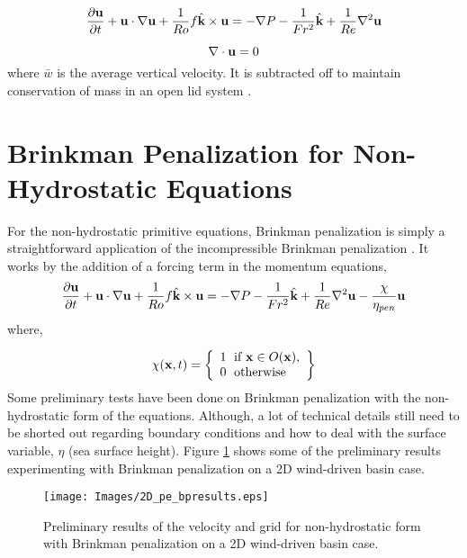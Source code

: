 \begin{equation*} \label{e:nh_momentum}
\frac{\partial {\bf u}}{\partial t} + {\bf u} \cdot \nabla {\bf u} + \frac{1}{Ro} f \hat{\bf k} \times {\bf u} = -\nabla P - \frac{1}{Fr^2} \hat{\bf k} + \frac{1}{Re} \nabla ^2 {\bf u} 
\end{equation*}

\begin{equation*}\label{e:nh_continuity}
\nabla \cdot {\bf u} = 0
\end{equation*}
%
where $\bar{w}$ is the average vertical velocity.  It is subtracted off to maintain conservation of mass in an open lid system \cite{97MAHPH}.

\section{Brinkman Penalization for Non-Hydrostatic Equations}

For the non-hydrostatic primitive equations, Brinkman penalization is simply a straightforward application of the incompressible Brinkman penalization \cite{84AC}.  It works by the addition of a forcing term in the momentum equations,   
%
\begin{equation*} \label{e:nh_momentum}
\frac{\partial {\bf u}}{\partial t} + {\bf u} \cdot \nabla {\bf u} + \frac{1}{Ro} f \hat{\bf k} \times {\bf u} = -\nabla P - \frac{1}{Fr^2} \hat{\bf k} + \frac{1}{Re} \nabla ^2 {\bf u} - \frac{\chi}{\eta_{pen}} {\bf u}
\end{equation*}
where, 

\begin{equation*} \label{e:nh_chi}
\chi ({\bf x},t) = \left \{ \begin{array}{l} 1 \; \mbox{ if } {\bf x} \in O({\bf x}), \\ 0 \; \mbox{ otherwise}
\end{array} \right \}
\end{equation*}
%
Some preliminary tests have been done on Brinkman penalization with the non-hydrostatic form of the equations.  Although, a lot of technical details still need to be shorted out regarding boundary conditions and how to deal with the surface variable, $\eta$ (sea surface height).  Figure \ref{f:prelimresults} shows some of the preliminary results experimenting with Brinkman penalization on a 2D wind-driven basin case.  

\begin{center}
\begin{figure}[htp]
\centering
  \texttt{[image: Images/2D\_pe\_bpresults.eps]}
  \caption[Preliminary results of non-hydrostatic form with Brinkman penalization]{Preliminary results of the velocity and grid for non-hydrostatic form with Brinkman penalization on a 2D wind-driven basin case.}\label{f:prelimresults}
\end{figure}
\end{center}

